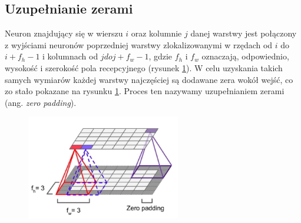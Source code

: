 \documentclass{article}
\begin{document}
\subsection{Uzupełnianie zerami}
Neuron znajdujący się w wierszu $i$ oraz kolumnie $j$ danej warstwy jest połączony z wyjściami neuronów poprzedniej warstwy zlokalizowanymi w rzędach od $i$ do $i+f_{h}-1$ i kolumnach od $j do j+f_{w}-1$, gdzie $f_{h}$ i $f_{w}$ oznaczają, odpowiednio, wysokość i szerokość pola recepcyjnego (rysunek \ref{padding}). W celu uzyskania takich samych wymiarów każdej warstwy najczęściej są dodawane zera wokół wejść, co zo stało pokazane na rysunku \ref{padding}. Proces ten nazywamy uzupełnianiem zerami (ang. \textit{zero padding}). \cite{geron}
\begin{figure}[H]
	\centering
	\includegraphics[width=0.6\textwidth,keepaspectratio=true]{padding}
	\caption{}
	\label{padding}
\end{figure}
\end{document}
